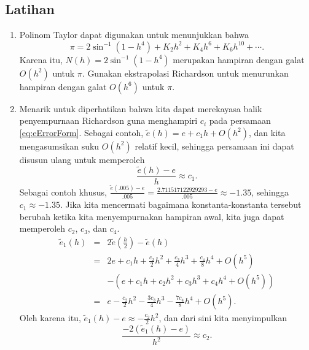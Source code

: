 \subsection{Latihan}
\begin{enumerate}
\item \label{exc:calculus-extrapolation}Polinom Taylor dapat digunakan
untuk menunjukkan bahwa
\[
\pi=2\sin^{-1}(1-h^{4})+K_{2}h^{2}+K_{4}h^{6}+K_{6}h^{10}+\cdots.
\]
Karena itu, $N(h)=2\sin^{-1}(1-h^{4})$ merupakan hampiran dengan
galat $O(h^{2})$ untuk $\pi$. Gunakan ekstrapolasi Richardson untuk
menurunkan hampiran dengan galat $O(h^{6})$ untuk $\pi$. \hasananswer 
\item Menarik untuk diperhatikan bahwa kita dapat merekayasa balik penyempurnaan
Richardson guna menghampiri $c_{i}$ pada persamaan \vref{eq:eErrorForm}.
Sebagai contoh, $\tilde{e}(h)=e+c_{1}h+O(h^{2})$, dan kita mengasumsikan
suku $O(h^{2})$ relatif kecil, sehingga persamaan ini dapat disusun
ulang untuk memperoleh
\[
\frac{\tilde{e}(h)-e}{h}\approx c_{1}.
\]
Sebagai contoh khusus, $\frac{\tilde{e}(.005)-e}{.005}=\frac{2.711517122929293-e}{.005}\approx-1.35$,
sehingga $c_{1}\approx-1.35$. Jika kita mencermati bagaimana konstanta-konstanta
tersebut berubah ketika kita menyempurnakan hampiran awal, kita juga
dapat memperoleh $c_{2}$, $c_{3}$, dan $c_{4}$. 
\begin{eqnarray*}
\tilde{e}_{1}(h) & = & 2\tilde{e}\left(\frac{h}{2}\right)-\tilde{e}(h)\\
 & = & 2e+c_{1}h+\frac{c_{2}}{2}h^{2}+\frac{c_{3}}{4}h^{3}+\frac{c_{4}}{8}h^{4}+O(h^{5})\\
 &  & -(e+c_{1}h+c_{2}h^{2}+c_{3}h^{3}+c_{4}h^{4}+O(h^{5}))\\
 & = & e-\frac{c_{2}}{2}h^{2}-\frac{3c_{3}}{4}h^{3}-\frac{7c_{4}}{8}h^{4}+O(h^{5}).
\end{eqnarray*}
Oleh karena itu, $\tilde{e}_{1}(h)-e\approx-\frac{c_{2}}{2}h^{2}$,
dan dari sini kita menyimpulkan 
\[
\frac{-2(\tilde{e}_{1}(h)-e)}{h^{2}}\approx c_{2}.
\]


\end{enumerate}
